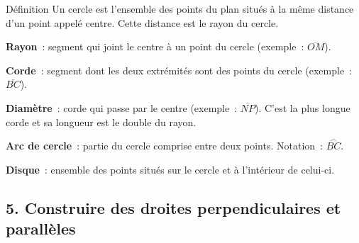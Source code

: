 \begin{regle}{Définition}
Un \textcolor{themeColor}{cercle} est l'ensemble des points du plan situés à la même distance d'un point appelé \textcolor{themeColor}{centre}. Cette distance est le \textcolor{themeColor}{rayon} du cercle.
\end{regle}

\vspace{8pt}
\noindent\begin{minipage}[c]{0.52\linewidth}
\textcolor{themeColor}{\textbf{Rayon}}~: segment qui joint le centre à un point du cercle (exemple~: $\overline{OM}$).\par\vspace{4pt}
\textcolor{themeColor}{\textbf{Corde}}~: segment dont les deux extrémités sont des points du cercle (exemple~: $\overline{BC}$).\par\vspace{4pt}
\textcolor{themeColor}{\textbf{Diamètre}}~: corde qui passe par le centre (exemple~: $\overline{NP}$). C'est la plus longue corde et sa longueur est le double du rayon.\par\vspace{4pt}
\textcolor{themeColor}{\textbf{Arc de cercle}}~: partie du cercle comprise entre deux points. Notation~: $\overset{\frown}{BC}$.\par\vspace{4pt}
\textcolor{themeColor}{\textbf{Disque}}~: ensemble des points situés sur le cercle et à l'intérieur de celui-ci.
\end{minipage}\hfill
\begin{minipage}[c]{0.44\linewidth}
\centering
{}
\end{minipage}

\vfill
\subsection*{5. Construire des droites perpendiculaires et parallèles}

